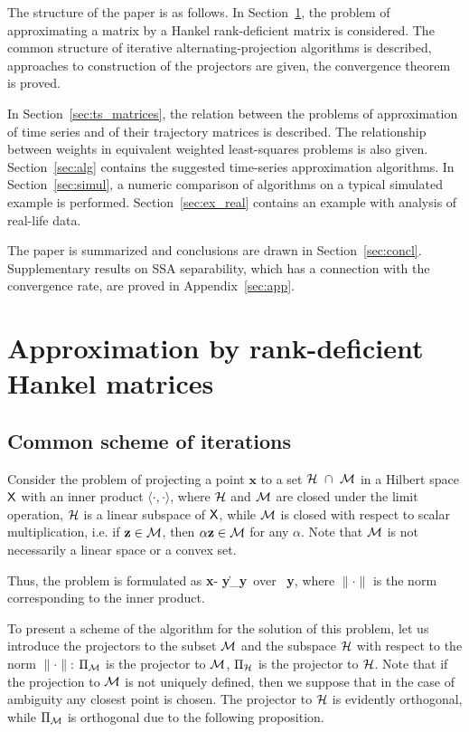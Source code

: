 \documentclass[sii]{ipart}
\newcommand{\bfx}{\textbf{x}}
\newcommand{\bfy}{\textbf{y}}
\newcommand{\bfz}{\textbf{z}}
\begin{document}
The structure of the paper is as follows.  In Section~\ref{sec:lowrank_appr}, the problem of approximating a matrix by a Hankel rank-deficient matrix is considered. The common structure of iterative alternating-projection algorithms is described, approaches to construction of the projectors are given, the convergence theorem is proved.

In Section~\ref{sec:ts_matrices}, the relation between the problems of approximation of time series and of their trajectory matrices is described. The relationship between weights in equivalent weighted least-squares problems is also given. Section~\ref{sec:alg} contains the suggested time-series approximation algorithms. In Section~\ref{sec:simul}, a numeric comparison of algorithms on a typical simulated example is performed. Section~\ref{sec:ex_real} contains an example with analysis of real-life data.

The paper is summarized and conclusions are drawn in Section~\ref{sec:concl}. Supplementary results on SSA separability, which has a connection with the convergence rate, are proved in Appendix~\ref{sec:app}.

\section{Approximation by rank-deficient Hankel matrices}
\label{sec:lowrank_appr}
\subsection{Common scheme of iterations}
Consider the problem of projecting a point $\bfx$ to a set $\mathcal{H}~ \cap~\mathcal{M}$ in a Hilbert space $\mathsf{X}$ with an inner product $\langle \cdot, \cdot \rangle$, where $\mathcal{H}$ and $\mathcal{M}$ are closed under the limit operation, $\mathcal{H}$ is a linear subspace of $\mathsf{X}$, while $\mathcal{M}$ is closed with respect to scalar multiplication, i.e.
if $\bfz \in \calM$, then $\alpha \bfz\in \calM$ for any $\alpha$. Note that  $\mathcal{M}$ is not necessarily a linear space or a convex set.

Thus, the problem is formulated as
\be
\label{eq:gen_task}
\|\bfx - \bfy\| \to \min_\bfy \mbox{\ over\ } \bfy \in \calH \cap \calM,
\ee
where $\|\cdot\|$ is the norm corresponding to the inner product.

To present a scheme of the algorithm for the solution of this problem, let us introduce the projectors to the subset $\mathcal{M}$ and the subspace $\mathcal{H}$ with respect to the norm $\|\cdot\|$: $\Pi_{\mathcal{M}}$ is the projector to $\mathcal{M}$,
$\Pi_{\mathcal{H}}$ is the projector to $\mathcal{H}$.
Note that if the projection to $\mathcal{M}$ is not uniquely defined, then we suppose that in the case of ambiguity any closest point is chosen.
The projector to $\mathcal{H}$ is evidently orthogonal, while $\Pi_{\mathcal{M}}$ is orthogonal due to the following proposition.
\end{document}
